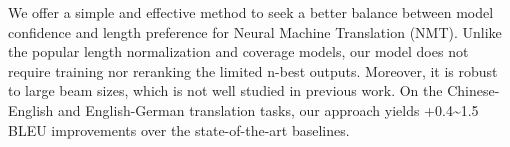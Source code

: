 We offer a simple and effective method to seek a better balance between model confidence and length preference for Neural Machine Translation (NMT). Unlike the popular length normalization and coverage models, our model does not require training nor reranking the limited n-best outputs. Moreover, it is robust to large beam sizes, which is not well studied in previous work. On the Chinese-English and English-German translation tasks, our approach yields +0.4{\textasciitilde}1.5 BLEU improvements over the state-of-the-art baselines.
